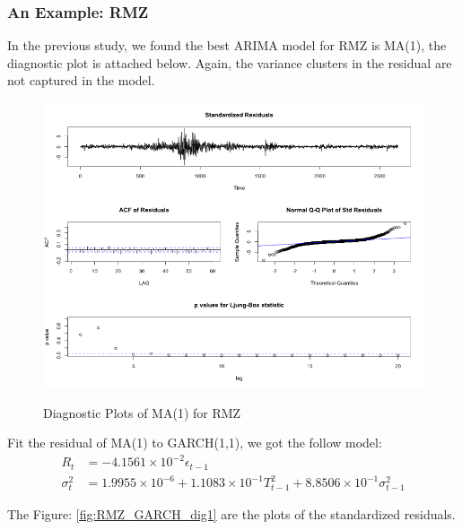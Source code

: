 \documentclass[12pt]{article}
\begin{document}
\subsubsection{An Example: RMZ}
In the previous study, we found the best ARIMA model for RMZ is MA(1), the diagnostic plot is attached below. Again, the variance clusters in the residual are not captured in the model.

\begin{figure}
  \caption{Diagnostic Plots of MA(1) for RMZ}
  \includegraphics[width = \textwidth]{../results/DiagnosticRMZ}
  \label{fig:DiagnosticRMZ}
\end{figure}

Fit the residual of MA(1) to GARCH(1,1), we got the follow model:
\begin{align*}
R_t &= -4.1561\times 10^{-2}\epsilon_{t-1} \\
\sigma_t^2 & = 1.9955 \times 10^{-6} +1.1083\times 10^{-1} T_{t-1}^2 +8.8506\times 10^{-1}  \sigma_{t-1}^2
\end{align*}

The Figure: \ref{fig:RMZ_GARCH_dig1} are the plots of the standardized residuals. 
\end{document}
